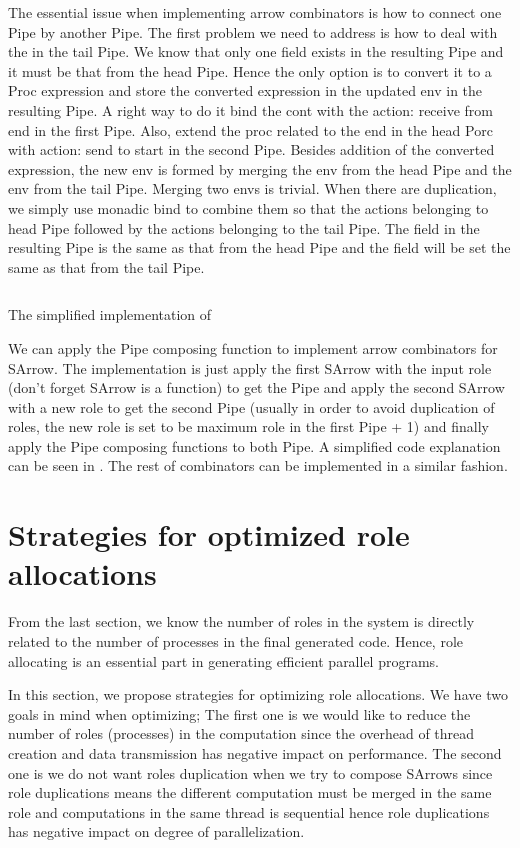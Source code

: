 The essential issue when implementing arrow combinators is how to connect one Pipe by another Pipe. The first problem we need to address is how to deal with the  in the tail Pipe. We know that only one  field exists in the resulting Pipe and it must be that from the head Pipe. Hence the only option is to convert it to a Proc expression and store the converted expression in the updated env in the resulting Pipe. A right way to do it bind the cont with the action: receive from end in the first Pipe. Also, extend the proc related to the end in the head Porc with action: send to start in the second Pipe. Besides addition of the converted  expression, the new env is formed by merging the env from the head Pipe and the env from the tail Pipe. Merging two envs is trivial. When there are duplication, we simply use monadic bind to combine them so that the actions belonging to head Pipe followed by the actions belonging to the tail Pipe. The  field in the resulting Pipe is the same as that from the head Pipe and the  field will be set the same as that from the tail Pipe.
\begin{listing}
\inputminted{Haskell}{arrow/impl.hs}
\caption{The simplified implementation of \hask{>>>}}
\label{SArrow:code:impl}
\end{listing}
We can apply the Pipe composing function to implement arrow combinators for SArrow. The implementation is just apply the first SArrow with the input role (don't forget SArrow is a function) to get the Pipe and apply the second SArrow with a new role to get the second Pipe (usually in order to avoid duplication of roles, the new role is set to be maximum role in the first Pipe + 1) and finally apply the Pipe composing functions to both Pipe. A simplified code explanation can be seen in . The rest of combinators can be implemented in a similar fashion.

\section{Strategies for optimized role allocations} \label{SArrow:roleAllc}
From the last section, we know the number of roles in the system is directly related to the number of processes in the final generated code. Hence, role allocating is an essential part in generating efficient parallel programs. 

In this section, we propose strategies for optimizing role allocations. We have two goals in mind when optimizing; The first one is we would like to reduce the number of roles (processes) in the computation since the overhead of thread creation and data transmission has negative impact on performance. The second one is we do not want roles duplication when we try to compose SArrows since role duplications means the different computation must be merged in the same role and computations in the same thread is sequential hence role duplications has negative impact on degree of parallelization. 

